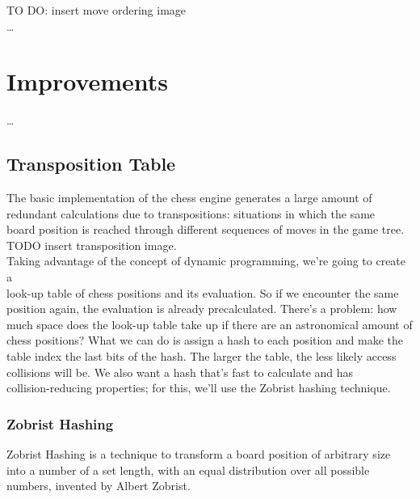 TO DO: insert move ordering image\\

\ldots

\section{Improvements}

\ldots

\subsection{Transposition Table}

The basic implementation of the chess engine generates a large amount of\\
redundant calculations due to transpositions: situations in which the same\\
board position is reached through different sequences of moves in the game tree.\\

TODO insert transposition image.\\

Taking advantage of the concept of dynamic programming, we're going to create a\\
look-up table of chess positions and its evaluation. So if we encounter the same\\
position again, the evaluation is already precalculated. There's a problem: how\\
much space does the look-up table take up if there are an astronomical amount
of chess positions? What we can do is assign a hash to each position and make the\\
table index the last bits of the hash. The larger the table, the less likely access\\
collisions will be. We also want a hash that's fast to calculate and has\\
collision-reducing properties; for this, we'll use the Zobrist hashing technique.\\

\subsubsection{Zobrist Hashing}

Zobrist Hashing is a technique to transform a board position of arbitrary size\\
into a number of a set length, with an equal distribution over all possible\\
numbers, invented by Albert Zobrist.\\

